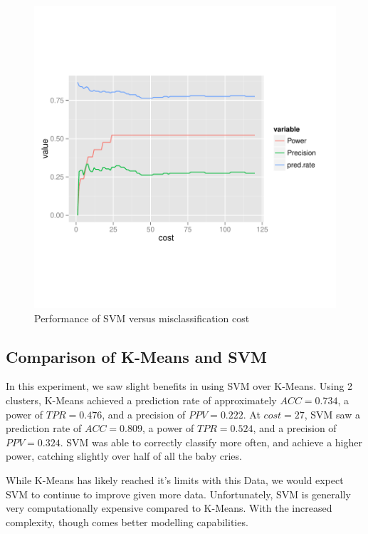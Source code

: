 \documentclass[paper=a4, fontsize=11pt]{scrartcl}
\numberwithin{equation}{section}
\numberwithin{figure}{section}
\numberwithin{table}{section}
\begin{document}
\begin{figure}[H]
\begin{center}
\vspace{-100pt}
\includegraphics[width=\textwidth]{svm_accuracy.pdf}
\vspace{-120pt}
\caption{Performance of SVM versus misclassification cost}
\end{center}
\end{figure}

\subsection{Comparison of K-Means and SVM}
In this experiment, we saw slight benefits in using SVM over K-Means. Using 2 clusters, K-Means achieved a prediction rate of approximately $ACC = 0.734$, a power of $TPR = 0.476$, and a precision of $PPV = 0.222$. At $cost = 27$, SVM saw a prediction rate of $ACC = 0.809$, a power of $TPR = 0.524$, and a precision of $PPV = 0.324$. SVM was able to correctly classify more often, and achieve a higher power, catching slightly over half of all the baby cries.

While K-Means has likely reached it's limits with this Data, we would expect SVM to continue to improve given more data. Unfortunately, SVM is generally very computationally expensive compared to K-Means. With the increased complexity, though comes better modelling capabilities.
\end{document}
